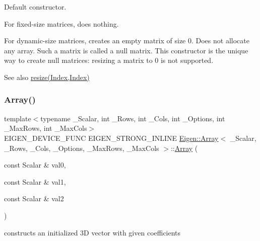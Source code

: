 Default constructor.

For fixed-\/size matrices, does nothing.

For dynamic-\/size matrices, creates an empty matrix of size 0. Does not allocate any array. Such a matrix is called a null matrix. This constructor is the unique way to create null matrices\+: resizing a matrix to 0 is not supported.

\begin{DoxySeeAlso}{See also}
\mbox{\hyperlink{class_eigen_1_1_plain_object_base_a99d9054ee2d5a40c6e00ded0265e9cea}{resize(\+Index,\+Index)}} 
\end{DoxySeeAlso}
\mbox{\label{class_eigen_1_1_array_adefff5a86babb44c362bd799c1cda965}} 
\subsubsection{\texorpdfstring{Array()}{Array()}\hspace{0.1cm}{\footnotesize\ttfamily [2/5]}}
{\footnotesize\ttfamily template$<$typename \+\_\+\+Scalar, int \+\_\+\+Rows, int \+\_\+\+Cols, int \+\_\+\+Options, int \+\_\+\+Max\+Rows, int \+\_\+\+Max\+Cols$>$ \\
E\+I\+G\+E\+N\+\_\+\+D\+E\+V\+I\+C\+E\+\_\+\+F\+U\+NC E\+I\+G\+E\+N\+\_\+\+S\+T\+R\+O\+N\+G\+\_\+\+I\+N\+L\+I\+NE \mbox{\hyperlink{class_eigen_1_1_array}{Eigen\+::\+Array}}$<$ \+\_\+\+Scalar, \+\_\+\+Rows, \+\_\+\+Cols, \+\_\+\+Options, \+\_\+\+Max\+Rows, \+\_\+\+Max\+Cols $>$\+::\mbox{\hyperlink{class_eigen_1_1_array}{Array}} (\begin{DoxyParamCaption}\item[{const Scalar \&}]{val0,  }\item[{const Scalar \&}]{val1,  }\item[{const Scalar \&}]{val2 }\end{DoxyParamCaption})\hspace{0.3cm}{\ttfamily [inline]}}

constructs an initialized 3D vector with given coefficients \mbox{\label{class_eigen_1_1_array_ad4d80ab64904b4b4e8e59d8a96f659b4}} 
